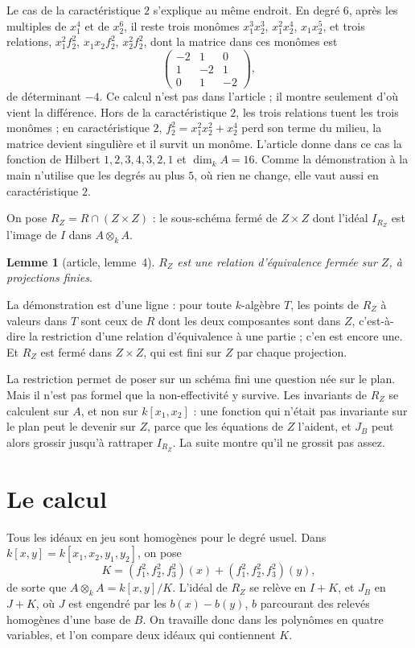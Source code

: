 \documentclass[11pt,a4paper]{amsart}
\theoremstyle{definition}
\theoremstyle{plain}
\newtheorem*{lemme}{Lemme}
\theoremstyle{remark}
\begin{document}
Le cas de la caractéristique $2$ s'explique au même endroit. En degré $6$, après les multiples de $x_1^4$ et de $x_2^6$, il reste trois monômes $x_1^3x_2^3$, $x_1^2x_2^4$, $x_1x_2^5$, et trois relations, $x_1^2f_2^2$, $x_1x_2f_2^2$, $x_2^2f_2^2$, dont la matrice dans ces monômes est
\[
\begin{pmatrix} -2 & 1 & 0 \\ 1 & -2 & 1 \\ 0 & 1 & -2 \end{pmatrix},
\]
de déterminant $-4$. Ce calcul n'est pas dans l'article ; il montre seulement d'où vient la différence. Hors de la caractéristique $2$, les trois relations tuent les trois monômes ; en caractéristique $2$, $f_2^2 = x_1^2x_2^2 + x_2^4$ perd son terme du milieu, la matrice devient singulière et il survit un monôme. L'article donne dans ce cas la fonction de Hilbert $1, 2, 3, 4, 3, 2, 1$ et $\dim_k A = 16$. Comme la démonstration à la main n'utilise que les degrés au plus $5$, où rien ne change, elle vaut aussi en caractéristique $2$.

On pose $R_Z = R \cap (Z \times Z)$ : le sous-schéma fermé de $Z \times Z$ dont l'idéal $I_{R_Z}$ est l'image de $I$ dans $A \otimes_k A$.

\begin{lemme}[article, lemme~4]
$R_Z$ est une relation d'équivalence fermée sur $Z$, à projections finies.
\end{lemme}

La démonstration est d'une ligne : pour toute $k$-algèbre $T$, les points de $R_Z$ à valeurs dans $T$ sont ceux de $R$ dont les deux composantes sont dans $Z$, c'est-à-dire la restriction d'une relation d'équivalence à une partie ; c'en est encore une. Et $R_Z$ est fermé dans $Z \times Z$, qui est fini sur $Z$ par chaque projection.

La restriction permet de poser sur un schéma fini une question née sur le plan. Mais il n'est pas formel que la non-effectivité y survive. Les invariants de $R_Z$ se calculent sur $A$, et non sur $k[x_1, x_2]$ : une fonction qui n'était pas invariante sur le plan peut le devenir sur $Z$, parce que les équations de $Z$ l'aident, et $J_B$ peut alors grossir jusqu'à rattraper $I_{R_Z}$. La suite montre qu'il ne grossit pas assez.

\section{Le calcul}

Tous les idéaux en jeu sont homogènes pour le degré usuel. Dans $k[x, y] = k[x_1, x_2, y_1, y_2]$, on pose
\[
K = (f_1^2, f_2^2, f_3^2)(x) + (f_1^2, f_2^2, f_3^2)(y),
\]
de sorte que $A \otimes_k A = k[x, y]/K$. L'idéal de $R_Z$ se relève en $I + K$, et $J_B$ en $J + K$, où $J$ est engendré par les $b(x) - b(y)$, $b$ parcourant des relevés homogènes d'une base de $B$. On travaille donc dans les polynômes en quatre variables, et l'on compare deux idéaux qui contiennent $K$.
\end{document}
